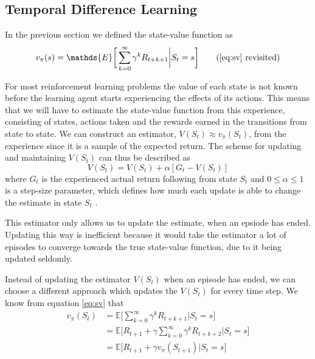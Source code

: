 \documentclass[11pt]{article}
\begin{document}
\maketitle

\subsection{Temporal Difference Learning}

In the previous section we defined the state-value function as
\begin{equation}
    v_\pi(s) = \mathds{E}\bigg[\sum\limits_{k=0}^\infty \gamma^k  R_{t+k+1} \bigg| S_t = s\bigg] \tag{\ref{eq:sv} revisited}
\end{equation}

For most reinforcement learning problems the value of each state
is not known before the learning agent starts experiencing the
effects of its actions.
This means that we will have to estimate the state-value function from this experience, consisting of states, actions taken and the rewards earned
in the transitions from state to state.
We can construct an estimator, $V(S_t) \approx v_\pi(S_t)$, from the experience
since it is a sample of the expected return.
The scheme for updating and maintaining $V(S_t)$ can thus be described as
\begin{equation}
    V(S_t) = V(S_t) + \alpha  [G_t - V(S_t)]
\end{equation}
where $G_t$ is the experienced actual return following from state
$S_t$ and $0 \leq \alpha \leq 1$ is a step-size parameter, 
which defines how much each update is able to change the estimate
in state $S_t$ \cite{RLbook}.

This estimator only allows us to update the estimate, when an epsiode
has ended.
Updating this way is inefficient because it would take the estimator
a lot of episodes to converge towards the true state-value function,
due to it being updated seldomly. 

Instead of updating the estimator $V(S_t)$ when an episode has
ended, we can choose a different approach which updates the $V(S_t)$
for every time step.
We know from equation \ref{eq:sv} that
\begin{equation}\label{eq:one_step}
    \begin{aligned}
        v_\pi(S_t) & = \mathds{E}\bigg[\sum\limits_{k=0}^\infty \gamma^k  R_{t+k+1} \bigg| S_t = s\bigg] \\
                   & = \mathds{E}\bigg[R_{t+1} + \gamma  \sum\limits_{k=0}^\infty \gamma^k  R_{t+k+2} \bigg| S_t = s\bigg] \\
                   & = \mathds{E}\bigg[R_{t+1} + \gamma  v_\pi(S_{t+1}) \bigg| S_t = s\bigg]
    \end{aligned}
\end{equation}
\end{document}
